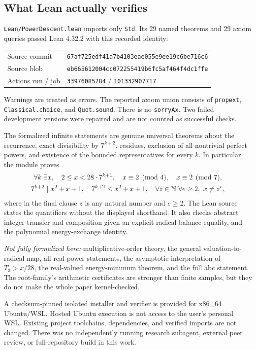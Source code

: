 \documentclass[11pt]{article}
\theoremstyle{definition}\newtheorem{definition}[theorem]{Definition}
\theoremstyle{remark}\newtheorem{remark}[theorem]{Remark}
\begin{document}
\subsection{What Lean actually verifies}
\texttt{Lean/PowerDescent.lean} imports only \texttt{Std}. Its 29 named
theorems and 29 axiom queries passed Lean 4.32.2 with this recorded identity:
\begin{center}\small
\begin{tabular}{ll}
Source commit & \texttt{67af725edf41a7b4103eae055e9ee19c6be716c6}\\
Source blob & \texttt{eb665612004cc072255419b6fc5af464f4dc1ffe}\\
Actions run / job & \texttt{33976085784} / \texttt{101332907717}
\end{tabular}\end{center}
Warnings are treated as errors. The reported axiom union consists of
\texttt{propext}, \texttt{Classical.choice}, and \texttt{Quot.sound}.
There is no \texttt{sorryAx}. Two failed development versions were repaired
and are not counted as successful checks.

The formalized infinite statements are genuine universal theorems about
the recurrence, exact divisibility by $7^{k+2}$, residues, exclusion of
all nontrivial perfect powers, and existence of the bounded
representatives for every $k$. In particular the module proves
\begin{gather*}
\forall k\ \exists x,\quad 2\le x<28\cdot7^{k+1},\quad
x\equiv2\pmod4,\quad x\equiv2\pmod7,\\
7^{k+2}\mid x^2+x+1,\quad 7^{k+2}\le x^2+x+1,\quad
\forall z\in\mathbb N\ \forall e\ge2,\ x\ne z^e,
\end{gather*}
where in the final clause $z$ is any natural number and $e\ge2$.
The Lean source states the quantifiers without the displayed shorthand.
It also checks abstract integer transfer and composition given an explicit
radical-balance equality, and the polynomial energy-exchange identity.

\emph{Not fully formalized here:} multiplicative-order theory, the general
valuation-to-radical map, all real-power statements, the asymptotic
interpretation of $T_3>x/28$, the real-valued energy-minimum theorem, and the
full abc statement. The root-family's arithmetic certificates are stronger
than finite samples, but they do not make the whole paper kernel-checked.

A checksum-pinned isolated installer and verifier is provided for x86\_64
Ubuntu/WSL. Hosted Ubuntu execution is not access to the user's personal
WSL. Existing project toolchains, dependencies, and verified imports are
not changed. There was no independently running research subagent,
external peer review, or full-repository build in this work.
\end{document}
